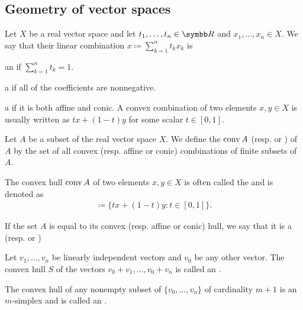 \subsection{Geometry of vector spaces}\label{sec:geometry_of_vector_spaces}

\begin{definition}\label{def:real_linear_combinations}
  Let \( X \) be a real vector space and let \( t_1, \ldots, t_n \in \BB{R} \) and \( x_1, \ldots, x_n \in X \). We say that their linear combination \( x \coloneqq \sum_{k=1}^n t_k x_k \) is

  \begin{defenum}
    \item\label{def:real_linear_combinations/affine} an  if \( \sum_{k=1}^n t_k = 1 \).
    \item\label{def:real_linear_combinations/conic} a  if all of the coefficients are nonnegative.
    \item\label{def:real_linear_combinations/convex} a  if it is both affine and conic. A convex combination of two elements \( x, y \in X \) is usually written as \( tx + (1-t)y \) for some scalar \( t \in [0, 1] \).
  \end{defenum}
\end{definition}

\begin{definition}\label{def:linear_combination_hulls}
  Let \( A \) be a subset of the real vector space \( X \). We define the  \( \operatorname{conv} A \) (resp.  or ) of \( A \) by the set of all convex (resp. affine or conic) combinations of finite subsets of \( A \).

  The convex hull \( \operatorname{conv} A \) of two elements \( x, y \in X \) is often called the  and is denoted as
  \begin{align*}
    [x, y] \coloneqq \{ tx + (1-t)y \colon t \in [0, 1] \}.
  \end{align*}

  If the set \( A \) is equal to its convex (resp. affine or conic) hull, we say that it is a  (resp.  or )
\end{definition}

\begin{definition}\label{def:simplex}
  Let \( v_1, \ldots, v_n \) be linearly independent vectors and \( v_0 \) be any other vector. The convex hull \( S \) of the vectors \( v_0 + v_1, \ldots, v_0 + v_n \) is called an .

  The convex hull of any nonempty subset of \( \{ v_0, \ldots, v_n \} \) of cardinality \( m + 1 \) is an \( m \)-simplex and is called an .
\end{definition}
